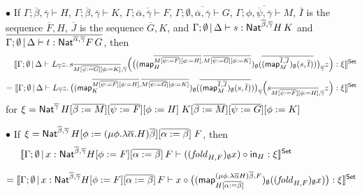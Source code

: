 \documentclass[runningheads]{llncs}
\newcommand{\map}{\mathsf{map}}
\newcommand{\fold}{\mathit{fold}}
\begin{document}
\vspace*{0.18in}

\noindent
$\bullet$\; If $\Gamma; \overline{\beta}, \overline{\gamma} \vdash
H$,\; $\Gamma; \overline{\beta}, \overline{\gamma} \vdash K$,\;
$\overline{\Gamma; \overline{\alpha}, \overline{\gamma} \vdash F}$,\;
$\overline{\Gamma; \emptyset, \overline{\alpha}, \overline{\gamma}
  \vdash G}$,\; 
$\overline{\Gamma; \phi, \overline{\psi}, \overline{\gamma} \vdash
  M}$,\; $\overline{I}$ is the sequence $\overline{F}, H$,\;
$\overline{J}$ is the sequence $\overline{G}, K$, and $\Gamma;
\emptyset\,|\,\Delta \vdash s : \mathsf{Nat}^{\overline{\beta},
  \overline{\gamma}} H\, K$ and $\overline{\Gamma; \emptyset \,|\,\Delta \vdash
  t : \mathsf{Nat}^{\overline{\alpha}, \overline{\gamma}} F\, G}$, then
\[\hspace*{0.13in}\setsem{\Gamma; \emptyset \,|\, \Delta
    \vdash L_{\overline{\gamma}} z.\,
    s_{\overline{M [\overline{\psi := G}] [\phi := K]},
      \overline{\gamma}} \Big(\big( (\map_{H}^{\overline{M
        [\overline{\psi := F}] [\phi := H]}, \overline{M
        [\overline{\psi := G}] [\phi := K]}})_\emptyset
    (\overline{(\map_{M}^{\overline{I}, \overline{J}})_\emptyset
      (s, \overline{t})}) \big)_{\overline{\gamma}} z \Big) : \xi}\]
\[= \setsem{\Gamma; \emptyset\,|\, \Delta \vdash
    L_{\overline{\gamma}} z.\, \big( (\map_{K}^{\overline{M
      [\overline{\psi := F}] [\phi := H]}, \overline{M [\overline{\psi
          := G}] [\phi := K]}})_\emptyset (\overline{(\map_{M}^{\overline{I},
    \overline{J}})_\emptyset (s, \overline{t})}) \big)_{\overline{\gamma}} \Big(
s_{\overline{M [\overline{\psi := F}] [\phi := H]}, \overline{\gamma}}
z \Big) : \xi}\] for $\xi = \mathsf{Nat}^{\overline{\gamma}}\,
  H[\overline{\beta:= M}] [\overline{\psi := F}] [\phi := H]\;
  K[\overline{\beta := M}] [\overline{\psi := G}] [\phi := K]$

\vspace*{0.18in}

\noindent
$\bullet$\; If $\xi = \mathsf{Nat}^{\overline{\beta}, \overline{\gamma}}\,
H[\phi := (\mu \phi. \lambda
  \overline{\alpha}. H)\overline{\beta}][\overline{\alpha := \beta}]\;
F$, then
\[\hspace*{-0.72in}\setsem{\Gamma; \emptyset \,|\, x:
  \Nat^{\overline{\beta}, \overline{\gamma}} H[\phi :=
    F][\overline{\alpha := \beta}]\, F \vdash ((\fold_{H,
    F})_{\emptyset} x) \circ \tin_{H} : \xi}\]

\vspace*{-0.15in}

\[= \setsem{ \Gamma; \emptyset \,|\, x: \Nat^{\overline{\beta},
    \overline{\gamma}} H[\phi := F][\overline{\alpha := \beta}]\, F
  \vdash x \circ \big( (\map_{H [\ol{\alpha := \beta}]}^{(\mu
    \phi. \lambda \overline{\alpha} H) \overline{\beta},
    F})_\emptyset ((\fold_{H, F})_{\emptyset} x) \big) : \xi}\]
\end{document}
